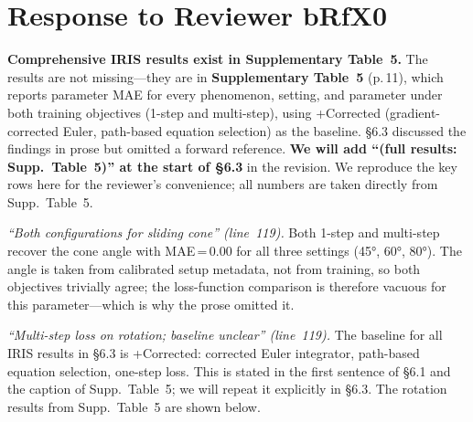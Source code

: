 \documentclass[10pt,twocolumn,letterpaper]{article}
\begin{document}
\section*{Response to Reviewer bRfX0}

\noindent\textbf{Comprehensive IRIS results exist in Supplementary Table~5.}
The results are not missing---they are in \textbf{Supplementary Table~5} (p.\,11), which reports parameter MAE for every phenomenon, setting, and parameter under both training objectives (1-step and multi-step), using +Corrected (gradient-corrected Euler, path-based equation selection) as the baseline. \S6.3 discussed the findings in prose but omitted a forward reference. \textbf{We will add ``(full results: Supp.\ Table~5)'' at the start of \S6.3} in the revision. We reproduce the key rows here for the reviewer's convenience; all numbers are taken directly from Supp.\ Table~5.

\noindent\textit{``Both configurations for sliding cone'' (line~119).} Both 1-step and multi-step recover the cone angle with MAE\,=\,0.00 for all three settings (45°, 60°, 80°). The angle is taken from calibrated setup metadata, not from training, so both objectives trivially agree; the loss-function comparison is therefore vacuous for this parameter—which is why the prose omitted it.

\noindent\textit{``Multi-step loss on rotation; baseline unclear'' (line~119).} The baseline for all IRIS results in \S6.3 is +Corrected: corrected Euler integrator, path-based equation selection, one-step loss. This is stated in the first sentence of \S6.1 and the caption of Supp.\ Table~5; we will repeat it explicitly in \S6.3. The rotation results from Supp.\ Table~5 are shown below.
\end{document}
